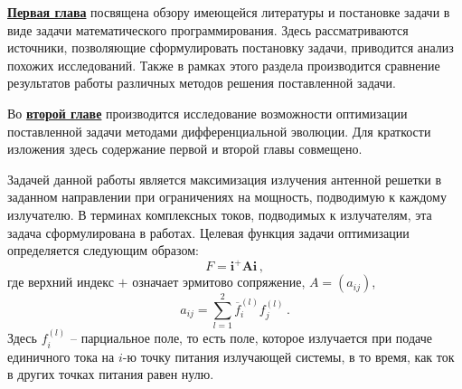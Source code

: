 \underline{\textbf{Первая глава}} посвящена обзору имеющейся литературы и постановке задачи в виде задачи математического программирования. Здесь рассматриваются источники, позволяющие сформулировать постановку задачи, приводится анализ похожих исследований. Также в рамках этого раздела производится сравнение результатов работы различных методов решения поставленной задачи.

Во \underline{\textbf{второй главе}} производится исследование возможности оптимизации поставленной задачи методами дифференциальной эволюции. Для краткости изложения здесь содержание первой и второй главы совмещено.

Задачей данной работы является максимизация излучения антенной решетки в заданном направлении при ограничениях на мощность, подводимую к каждому излучателю. В терминах комплексных токов, подводимых к излучателям, эта задача сформулирована в работах. Целевая функция задачи оптимизации определяется следующим образом:
%
    \begin{equation}
        F = \textbf{i}^{+}\textbf{Ai} \, ,
        \label{eq:F}
    \end{equation}
%
где верхний индекс $+$ означает эрмитово сопряжение, $A = (a_{ij})$,
%
     \begin{equation}
        a_{ij} = \sum_{l=1}^2\overline{f}_{i}^{(l)}f_{j}^{(l)}
        \label{eq:A} \, .
    \end{equation}
%
Здесь $f_i^{(l)}$ -- парциальное поле, то есть поле, которое излучается при подаче единичного тока на $i$-ю точку питания излучающей системы, в то время, как ток в других точках питания равен нулю.

